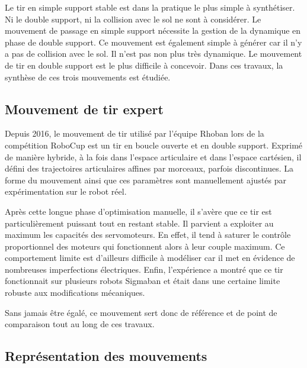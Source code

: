 Le tir en simple support stable est dans la pratique le plus simple 
à synthétiser. Ni le double support, ni la collision avec le sol
ne sont à considérer.
Le mouvement de passage en simple support nécessite la gestion 
de la dynamique en phase de double support. 
Ce mouvement est également simple à générer car il n'y a pas de collision avec 
le sol. Il n'est pas non plus très dynamique.
Le mouvement de tir en double support est le plus difficile à concevoir.
Dans ces travaux, la synthèse de ces trois mouvements est étudiée.

\subsection{Mouvement de tir expert}

Depuis 2016, le mouvement de tir utilisé par l'équipe Rhoban lors
de la compétition RoboCup est un tir en boucle ouverte et en double support.
Exprimé de manière hybride, à la fois dans l'espace articulaire
et dans l'espace cartésien, il défini des trajectoires articulaires 
affines par morceaux, parfois discontinues.
La forme du mouvement ainsi que ces paramètres sont manuellement 
ajustés par expérimentation sur le robot réel.

Après cette longue phase \og d'optimisation \fg manuelle, 
il s'avère que ce tir est particulièrement puissant tout en restant stable. 
Il parvient a exploiter au maximum les capacités des servomoteurs.
En effet, il tend à saturer le contrôle proportionnel des moteurs 
qui fonctionnent alors à leur couple maximum. 
Ce comportement limite est d'ailleurs difficile à modéliser car il met en 
évidence de nombreuses imperfections électriques.
Enfin, l'expérience a montré que ce tir fonctionnait sur plusieurs robots 
Sigmaban et était dans une certaine limite robuste aux modifications mécaniques.

Sans jamais être égalé, ce mouvement sert donc de référence et de point de
comparaison tout au long de ces travaux.
        
\subsection{Représentation des mouvements\label{sec:motion_representation}}

